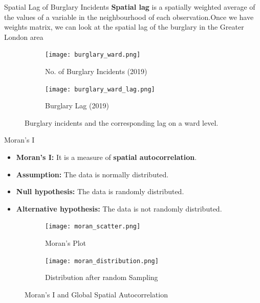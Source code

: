 \documentclass[10pt, aspectratio=169]{beamer}
\begin{document}
\begin{frame}{Spatial Lag of Burglary Incidents}
    \textbf{Spatial lag} is a spatially weighted average of the values of a
    variable in the neighbourhood of each observation.Once we have weights matrix,
    we can look at the spatial lag of the burglary in the Greater London area

    \begin{figure}
        \centering
            \begin{subfigure}[t]{0.4\textwidth}
                \texttt{[image: burglary\_ward.png]}
                \caption{No. of Burglary Incidents (2019)}\label{fig:burglary}
            \end{subfigure}
            \begin{subfigure}[t]{0.4\textwidth}
                \texttt{[image: burglary\_ward\_lag.png]}
                \caption{Burglary Lag (2019)}\label{fig:burglary_lag}
            \end{subfigure}
        \caption{Burglary incidents and the corresponding lag on a ward level.}\label{fig:lag}
    \end{figure}
\end{frame}

\begin{frame}{Moran's I}

    \begin{itemize}
        \item \textbf{Moran's I:} It is a measure of \textbf{spatial autocorrelation}.
        \item \textbf{Assumption:} The data is normally distributed.
        \item \textbf{Null hypothesis:} The data is randomly distributed.
        \item \textbf{Alternative hypothesis:} The data is not randomly distributed.
    \end{itemize}
    \begin{figure}
        \centering
            \begin{subfigure}[t]{0.4\textwidth}
                \texttt{[image: moran\_scatter.png]}
                \caption{Moran's Plot}\label{fig:moran_scatter}
            \end{subfigure}
            \begin{subfigure}[t]{0.4\textwidth}
                \texttt{[image: moran\_distribution.png]}
                \caption{Distribution after random Sampling}\label{fig:moran_distribution}
            \end{subfigure}
        \caption{Moran's I and Global Spatial Autocorrelation}\label{fig:moran}
    \end{figure}
\end{frame}
\end{document}
